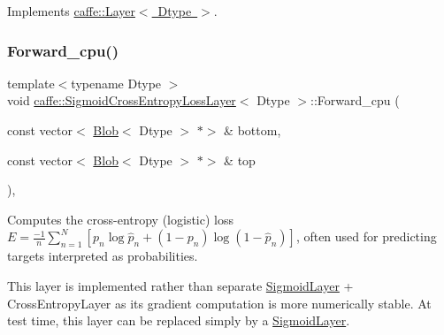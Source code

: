 Implements \mbox{\hyperlink{classcaffe_1_1_layer_a576ac6a60b1e99fe383831f52a6cea77}{caffe\+::\+Layer$<$ Dtype $>$}}.

\mbox{\label{classcaffe_1_1_sigmoid_cross_entropy_loss_layer_aa3e7f285742d862435d5e49d13e05064}} 
\subsubsection{\texorpdfstring{Forward\+\_\+cpu()}{Forward\_cpu()}\hspace{0.1cm}{\footnotesize\ttfamily [2/2]}}
{\footnotesize\ttfamily template$<$typename Dtype $>$ \\
void \mbox{\hyperlink{classcaffe_1_1_sigmoid_cross_entropy_loss_layer}{caffe\+::\+Sigmoid\+Cross\+Entropy\+Loss\+Layer}}$<$ Dtype $>$\+::Forward\+\_\+cpu (\begin{DoxyParamCaption}\item[{const vector$<$ \mbox{\hyperlink{classcaffe_1_1_blob}{Blob}}$<$ Dtype $>$ $\ast$$>$ \&}]{bottom,  }\item[{const vector$<$ \mbox{\hyperlink{classcaffe_1_1_blob}{Blob}}$<$ Dtype $>$ $\ast$$>$ \&}]{top }\end{DoxyParamCaption})\hspace{0.3cm}{\ttfamily [protected]}, {\ttfamily [virtual]}}



Computes the cross-\/entropy (logistic) loss $ E = \frac{-1}{n} \sum\limits_{n=1}^N \left[ p_n \log \hat{p}_n + (1 - p_n) \log(1 - \hat{p}_n) \right] $, often used for predicting targets interpreted as probabilities. 

This layer is implemented rather than separate \mbox{\hyperlink{classcaffe_1_1_sigmoid_layer}{Sigmoid\+Layer}} + Cross\+Entropy\+Layer as its gradient computation is more numerically stable. At test time, this layer can be replaced simply by a \mbox{\hyperlink{classcaffe_1_1_sigmoid_layer}{Sigmoid\+Layer}}.


